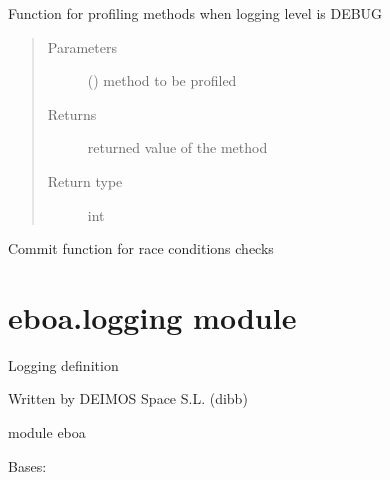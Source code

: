 \begin{fulllineitems}
\label{\detokenize{eboa:eboa.debugging.debug}}
Function for profiling methods when logging level is DEBUG
\begin{quote}\begin{description}
\item[{Parameters}] \leavevmode
{} () \textendash{} method to be profiled

\item[{Returns}] \leavevmode
returned value of the method

\item[{Return type}] \leavevmode
int

\end{description}\end{quote}

\end{fulllineitems}


\begin{fulllineitems}
\label{\detokenize{eboa:eboa.debugging.race_condition}}
Commit function for race conditions checks

\end{fulllineitems}



\section{eboa.logging module}
\label{\detokenize{eboa:module-eboa.logging}}\label{\detokenize{eboa:eboa-logging-module}}
Logging definition

Written by DEIMOS Space S.L. (dibb)

module eboa

\begin{fulllineitems}
\label{\detokenize{eboa:eboa.logging.Log}}
Bases: 

\begin{fulllineitems}
\label{\detokenize{eboa:eboa.logging.Log.define_logging_configuration}}
\end{fulllineitems}


\end{fulllineitems}



